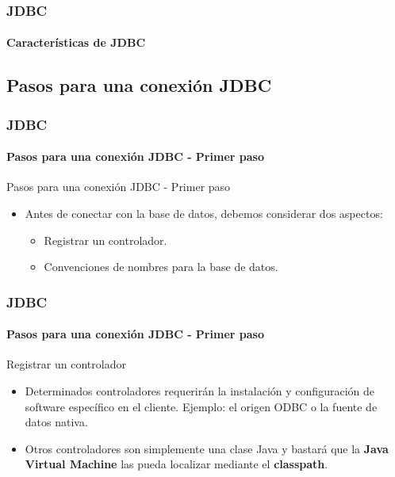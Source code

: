 \documentclass{beamer}
\begin{document}
	\begin{frame}
		\frametitle{JDBC}
		\framesubtitle{Caracter\'isticas de JDBC}

		    \begin{center}
			\end{center}
	\end{frame}

    \subsection{Pasos para una conexi\'on JDBC}

	\begin{frame}
		\frametitle{JDBC}
		\framesubtitle{Pasos para una conexi\'on JDBC - Primer paso}

        \begin{exampleblock}{Pasos para una conexi\'on JDBC - Primer paso}
		    \begin{itemize}
		        \item Antes de conectar con la base de datos, debemos considerar dos aspectos:
		        \begin{itemize}
		            \item Registrar un controlador.
		            \item Convenciones de nombres para la base de datos.
		        \end{itemize}
		    \end{itemize}
		    \end{exampleblock}
	\end{frame}

	\begin{frame}
		\frametitle{JDBC}
		\framesubtitle{Pasos para una conexi\'on JDBC - Primer paso}

        \begin{exampleblock}{Registrar un controlador}
		    \begin{itemize}
		        \item Determinados controladores requerir\'an la instalaci\'on y configuraci\'on de software espec\'ifico en el cliente. Ejemplo: el origen ODBC o la fuente de datos nativa.
		        \item Otros controladores son simplemente una clase Java y bastar\'a que la \textbf{Java Virtual Machine} las pueda localizar mediante el \textbf{classpath}.
		    \end{itemize}
		    \end{exampleblock}
	\end{frame}
\end{document}
